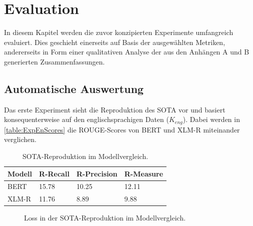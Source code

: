 \chapter{Evaluation}
\thispagestyle{fancy}
\label{chap:Evaluation}

\noindent
In diesem Kapitel werden die zuvor konzipierten Experimente umfangreich evaluiert. Dies geschieht einerseits auf Basis der ausgewählten Metriken, andererseits in Form einer qualitativen Analyse der aus den Anhängen A und B generierten Zusammenfassungen.


\section{Automatische Auswertung}
\noindent
Das erste Experiment sieht die Reproduktion des \ac{SOTA} vor und basiert konsequenterweise auf den englischsprachigen Daten ($K_{eng}$). Dabei werden in \autoref{table:ExpEnScores} die \ac{ROUGE}-Scores von \ac{BERT} und \ac{XLM-R} miteinander verglichen.\\

\begin{table}[htb]
\centering
\begin{tabular}{ | p{2.5cm} | p{2.5cm} | p{2.5cm} | p{2.5cm} | }
\hline
\textbf{Modell} & \textbf{R-Recall} & \textbf{R-Precision} & \textbf{R-Measure} \\
\hline
BERT & 15.78 & 10.25 & 12.11 \\
\hline
XLM-R & 11.76 & 8.89 & 9.88 \\
\hline
\end{tabular}
\caption{SOTA-Reproduktion im Modellvergleich.}
\label{table:ExpEnScores}
\end{table}

\begin{figure}[h]
  \centering
  \caption{Loss in der SOTA-Reproduktion im Modellvergleich.}
  \label{pic:ExpEnLoss}
\end{figure}

